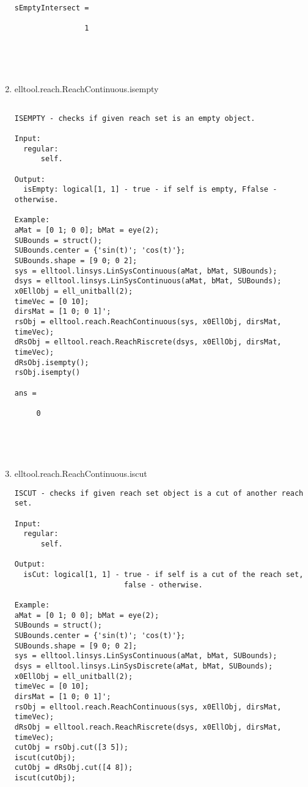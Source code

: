 \begin{enumerate}
\begin{lstlisting}
sEmptyIntersect =

                1





\end{lstlisting}
\fontfamily{\familydefault}
\selectfont
\item {elltool.reach.ReachContinuous.isempty}
\selectfont
\begin{lstlisting}

ISEMPTY - checks if given reach set is an empty object.

Input:
  regular:
      self.

Output:
  isEmpty: logical[1, 1] - true - if self is empty, Ffalse - otherwise.

Example:
aMat = [0 1; 0 0]; bMat = eye(2);
SUBounds = struct();
SUBounds.center = {'sin(t)'; 'cos(t)'};
SUBounds.shape = [9 0; 0 2];
sys = elltool.linsys.LinSysContinuous(aMat, bMat, SUBounds);
dsys = elltool.linsys.LinSysContinuous(aMat, bMat, SUBounds);
x0EllObj = ell_unitball(2);
timeVec = [0 10];
dirsMat = [1 0; 0 1]';
rsObj = elltool.reach.ReachContinuous(sys, x0EllObj, dirsMat, timeVec);
dRsObj = elltool.reach.ReachRiscrete(dsys, x0EllObj, dirsMat, timeVec);
dRsObj.isempty();
rsObj.isempty()

ans =

     0





\end{lstlisting}
\fontfamily{\familydefault}
\selectfont
\item {elltool.reach.ReachContinuous.iscut}
\selectfont
\begin{lstlisting}
ISCUT - checks if given reach set object is a cut of another reach set.

Input:
  regular:
      self.

Output:
  isCut: logical[1, 1] - true - if self is a cut of the reach set,
                         false - otherwise.

Example:
aMat = [0 1; 0 0]; bMat = eye(2);
SUBounds = struct();
SUBounds.center = {'sin(t)'; 'cos(t)'};
SUBounds.shape = [9 0; 0 2];
sys = elltool.linsys.LinSysContinuous(aMat, bMat, SUBounds);
dsys = elltool.linsys.LinSysDiscrete(aMat, bMat, SUBounds);
x0EllObj = ell_unitball(2);
timeVec = [0 10];
dirsMat = [1 0; 0 1]';
rsObj = elltool.reach.ReachContinuous(sys, x0EllObj, dirsMat, timeVec);
dRsObj = elltool.reach.ReachRiscrete(dsys, x0EllObj, dirsMat, timeVec);
cutObj = rsObj.cut([3 5]);
iscut(cutObj);
cutObj = dRsObj.cut([4 8]);
iscut(cutObj);






\end{lstlisting}
\end{enumerate}
